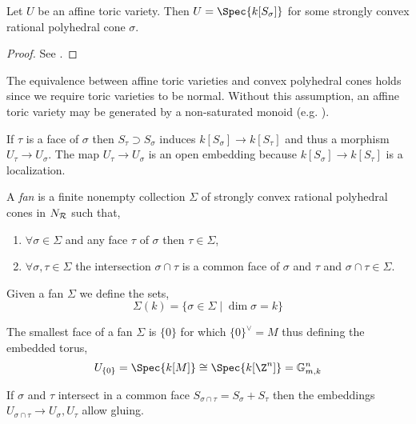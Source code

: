 \begin{theorem}
Let $U$ be an affine toric variety. Then $U = \Spec{k[S_\sigma]}$ for some strongly convex rational polyhedral cone $\sigma$.
\end{theorem}

\begin{proof}
See \cite[Thm. 1.3.5]{cox}.
\end{proof}

\begin{rmk}
The equivalence between affine toric varieties and convex polyhedral cones holds since we require toric varieties to be normal. Without this assumption, an affine toric variety may be generated by a non-saturated monoid (e.g. \cite[Ex. 1.10]{cox_lectures}).
\end{rmk}

\begin{remark}
If $\tau$ is a face of $\sigma$ then $S_\tau \supset S_\sigma$ induces $k[S_\sigma] \to k[S_\tau]$ and thus a morphism $U_\tau \to U_\sigma$. The map $U_\tau \to U_\sigma$ is an open embedding because $k[S_\sigma] \to k[S_\tau]$ is a localization. 
\end{remark}

\begin{definition}
A \textit{fan} is a finite nonempty collection $\Sigma$ of strongly convex rational polyhedral cones in $N_{\mathcal{R}}$ such that,
\begin{enumerate}
\item $\forall \sigma \in \Sigma$ and any face $\tau$ of $\sigma$ then $\tau \in \Sigma$,
\item $\forall \sigma, \tau \in \Sigma$ the intersection $\sigma \cap \tau$ is a common face of $\sigma$ and $\tau$ and $\sigma \cap \tau \in \Sigma$.
\end{enumerate}
Given a fan $\Sigma$ we define the sets,
\[ \Sigma(k) = \{ \sigma \in \Sigma \mid \dim{\sigma} = k \} \]
\end{definition}

\begin{remark}
The smallest face of a fan $\Sigma$ is $\{ 0 \}$ for which $\{ 0 \}^\vee = M$ thus defining the embedded torus,
\[ U_{\{0\}} = \Spec{k[M]} \cong \Spec{k[\Z^n]} = \mathbb{G}_{m,k}^n \]
\end{remark}

\begin{remark}
If $\sigma$ and $\tau$ intersect in a common face $S_{\sigma \cap \tau} = S_\sigma + S_\tau$ then the embeddings $U_{\sigma \cap \tau} \to U_{\sigma}, U_{\tau}$ allow gluing. 
\end{remark}


